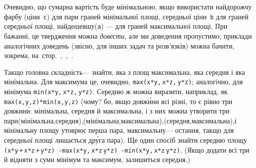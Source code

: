 \Tutorial
Очевидно, що сумарна вартість буде мінімальною, якщо використати найдорожчу фарбу (ціни~\texttt{c}) для пари граней мінімальної площі, середньої ціни~\texttt{b} для граней середньої площі, найдешевшу\nolinebreak[3] (\texttt{a}) \nolinebreak[3] --- для граней максимальної площі. При бажанні, це твердження можна \emph{довести}, але ми доведення пропустимо; приклади аналогічних доведень (звісно, для інших задач та розв'язків) можна бачити, зокрема, на~стор.~\pageref{text:proof-example-parket-1},~\pageref{text:proof-example-train-to-ship},~\pageref{text:proof-max-num-by-strike-out-one-digit}.

Так\nolinebreak[3] що головна складність\nolinebreak[3] --- знайти, яка з площ максимальна, яка середня і яка мінімальна. Для максимума це, очевидно, 
\texttt{\mbox{max(x*y,$\,$x*z,$\,$y*z)}};
аналогічно, для мінімума 
\texttt{\mbox{min(x*y,$\,$x*z,$\,$y*z)}}. 
Середню ж можна виразити, наприклад, як \texttt{\mbox{max(x,y,z)*min(x,y,z)}} 
(чому? бо, якщо довж\'{и}ни всі різні, то є рівно три дов\-жин\'{и}: мінімальна, середня й максимальна, і з них можна утворити три \mbox{пари}\linebreak[2] 
(мінімальна,\nolinebreak[2] середня),\linebreak[2]
(мінімальна,\nolinebreak[2] максимальна),\linebreak[2]
(середня,\nolinebreak[2] максимальна),\linebreak[2]
і мінімальну площу утоврює перша пара, максимальну\nolinebreak[3] --- остання, 
так\nolinebreak[3] що для середньої площі лишається др\'{у}га пара).
%
Ще один спосіб знайти середню площу
\texttt{\mbox{(x*y$\,$+$\,$x*z$\,$+$\,$y*z) -}}\nolinebreak[1]  
\texttt{\mbox{max(x*y,$\,$x*z$\,$y*z) -}}\nolinebreak[1]  
\texttt{\mbox{min(x*y,$\,$x*z$\,$y*z)}}.
(Якщо додати всі три й відняти з суми мінімум та максимум, залишиться середня.)

